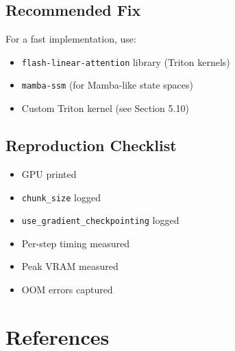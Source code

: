 \subsection{Recommended Fix}

For a fast implementation, use:

\begin{itemize}
\item \texttt{flash-linear-attention} library (Triton kernels)
\item \texttt{mamba-ssm} (for Mamba-like state spaces)
\item Custom Triton kernel (see Section 5.10)

\end{itemize}
\subsection{Reproduction Checklist}

\begin{itemize}
\item [x] GPU printed
\item [x] \texttt{chunk\_size} logged
\item [x] \texttt{use\_gradient\_checkpointing} logged
\item [x] Per-step timing measured
\item [x] Peak VRAM measured
\item [x] OOM errors captured

\end{itemize}



\section{References}

